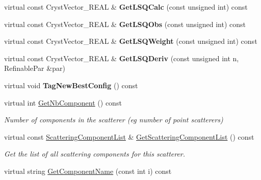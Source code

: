 \begin{DoxyCompactItemize}
virtual const Cryst\+Vector\+\_\+\+R\+E\+AL \& {\bfseries Get\+L\+S\+Q\+Calc} (const unsigned int) const
\item 
\mbox{\label{class_obj_cryst_1_1_molecule_a7fe790c889f83f55bd149d6177b6e863}} 
virtual const Cryst\+Vector\+\_\+\+R\+E\+AL \& {\bfseries Get\+L\+S\+Q\+Obs} (const unsigned int) const
\item 
\mbox{\label{class_obj_cryst_1_1_molecule_af539b19fa94ac4176394b6f16e892be2}} 
virtual const Cryst\+Vector\+\_\+\+R\+E\+AL \& {\bfseries Get\+L\+S\+Q\+Weight} (const unsigned int) const
\item 
\mbox{\label{class_obj_cryst_1_1_molecule_acea418c1fcd0e2e9240166f27c86ba6a}} 
virtual const Cryst\+Vector\+\_\+\+R\+E\+AL \& {\bfseries Get\+L\+S\+Q\+Deriv} (const unsigned int n, Refinable\+Par \&par)
\item 
\mbox{\label{class_obj_cryst_1_1_molecule_a71493c917ba8afbb5f79dc1776ef9b08}} 
virtual void {\bfseries Tag\+New\+Best\+Config} () const
\item 
\mbox{\label{class_obj_cryst_1_1_molecule_a839d362bb9c2e6f0951caf00c8c8e92c}} 
virtual int \mbox{\hyperlink{class_obj_cryst_1_1_molecule_a839d362bb9c2e6f0951caf00c8c8e92c}{Get\+Nb\+Component}} () const
\begin{DoxyCompactList}\small\item\em Number of components in the scatterer (eg number of point scatterers) \end{DoxyCompactList}\item 
virtual const \mbox{\hyperlink{class_obj_cryst_1_1_scattering_component_list}{Scattering\+Component\+List}} \& \mbox{\hyperlink{class_obj_cryst_1_1_molecule_a03f7f32ade8523f118cab14a21a87843}{Get\+Scattering\+Component\+List}} () const
\begin{DoxyCompactList}\small\item\em Get the list of all scattering components for this scatterer. \end{DoxyCompactList}\item 
virtual string \mbox{\hyperlink{class_obj_cryst_1_1_molecule_aa72f797c744577e606fa6976d8c7dcf8}{Get\+Component\+Name}} (const int i) const
\item 

\end{DoxyCompactItemize}
